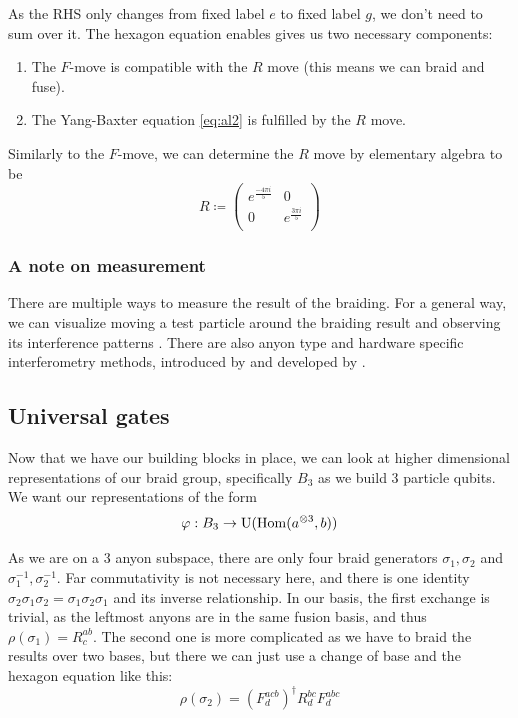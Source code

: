 \documentclass{article}
\begin{document}
As the RHS only changes from fixed label $e$ to fixed label $g$, we don't need to sum over it.
The hexagon equation enables gives us two necessary components:
\begin{enumerate}
  \item The $F$-move is compatible with the $R$ move (this means we can braid and fuse).
  \item The Yang-Baxter equation \eqref{eq:al2} is fulfilled by the $R$ move.
\end{enumerate}
Similarly to the $F$-move, we can determine the $R$ move by elementary algebra to be
\[
  R \coloneqq \begin{pmatrix}
    e^{\frac{-4\pi i}{5}} & 0  \\
    0 & e^{\frac{3\pi i}{5}}  \\
  \end{pmatrix}
\]

\subsubsection{A note on measurement}

There are multiple ways to measure the result of the braiding. For a general way, we can visualize moving a test particle around the braiding result and observing its interference patterns \cite{simon_topological_2021}. There are also anyon type and hardware specific interferometry methods, introduced by \cite{overbosch_inequivalent_2001} and developed by \cite{bonesteel_braid_2005}.

\subsection{Universal gates}

Now that we have our building blocks in place, we can look at higher dimensional representations of our braid group, specifically $B_3$ as we build $3$ particle qubits. We want our representations of the form
\[
  \varphi : B_3 \to \mathrm{U}(\operatorname{Hom}(a^{\otimes 3}, b))
\]

As we are on a $3$ anyon subspace, there are only four braid generators $\sigma_1, \sigma_2$ and $\sigma_1^{-1}, \sigma_2^{-1}$. Far commutativity is not necessary here, and there is one identity $\sigma_2 \sigma_1 \sigma_2 = \sigma_1 \sigma_2 \sigma_1$ and its inverse relationship. In our basis, the first exchange is trivial, as the leftmost anyons are in the same fusion basis, and thus $\rho(\sigma_1) = R^{ab}_{c}$. The second one is more complicated as we have to braid the results over two bases, but there we can just use a change of base and the hexagon equation like this:
\[
  \rho(\sigma_2) = \left(F^{acb}_{d}\right)^{\dagger}R^{bc}_{d}F^{abc}_{d}
\]
\end{document}
